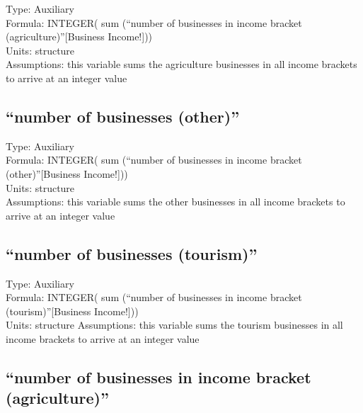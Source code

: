 \documentclass[
  11pt,
]{book}
\begin{document}
Type: Auxiliary\\
Formula: INTEGER( sum (``number of businesses in income bracket (agriculture)''{[}Business Income!{]}))\\
Units: structure\\
Assumptions: this variable sums the agriculture businesses in all income brackets to arrive at an integer value

\hypertarget{number-of-businesses-other}{%
\subsection{``number of businesses (other)''}\label{number-of-businesses-other}}

Type: Auxiliary\\
Formula: INTEGER( sum (``number of businesses in income bracket (other)''{[}Business Income!{]}))\\
Units: structure\\
Assumptions: this variable sums the other businesses in all income brackets to arrive at an integer value

\hypertarget{number-of-businesses-tourism}{%
\subsection{``number of businesses (tourism)''}\label{number-of-businesses-tourism}}

Type: Auxiliary\\
Formula: INTEGER( sum (``number of businesses in income bracket (tourism)''{[}Business Income!{]}))\\
Units: structure
Assumptions: this variable sums the tourism businesses in all income brackets to arrive at an integer value

\hypertarget{number-of-businesses-in-income-bracket-agriculture}{%
\subsection{``number of businesses in income bracket (agriculture)''}\label{number-of-businesses-in-income-bracket-agriculture}}
\end{document}
